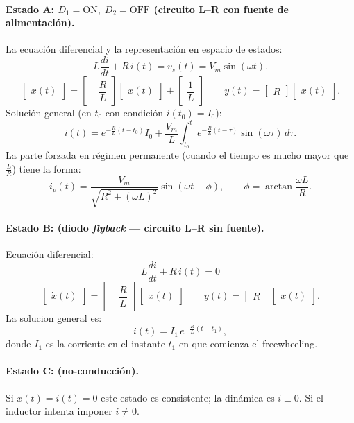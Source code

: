 \documentclass[conference]{IEEEtran}
\begin{document}
\paragraph{Estado A: \(D_1=\mathrm{ON},\;D_2=\mathrm{OFF}\) (circuito L–R  con fuente de alimentación).}
La ecuación diferencial y la representación en espacio de estados:
\[
L\frac{di}{dt} + R\,i(t) = v_s(t) = V_m\sin(\omega t).
\]
\[
\begin{bmatrix}\dot{x}(t)\end{bmatrix}
=
\begin{bmatrix}-\dfrac{R}{L}\end{bmatrix}
\begin{bmatrix}x(t)\end{bmatrix}
+
\begin{bmatrix}\dfrac{1}{L}\end{bmatrix}
\qquad
y(t)=\begin{bmatrix}R\end{bmatrix}\begin{bmatrix}x(t)\end{bmatrix}.
\]
Solución general (en \(t_0\) con condición \(i(t_0)=I_0\)):
\[
i(t)=e^{-\frac{R}{L}(t-t_0)}I_0 + \frac{V_m}{L}\int_{t_0}^{t} e^{-\frac{R}{L}(t-\tau)}\sin(\omega \tau)\,d\tau.
\]
La parte forzada en régimen permanente (cuando el tiempo es mucho mayor que \(\tfrac{L}{R}\)) tiene la forma:
\[
i_p(t)=\frac{V_m}{\sqrt{R^2+(\omega L)^2}}\sin(\omega t - \phi),\qquad \phi=\arctan\!\frac{\omega L}{R}.
\]

\paragraph{Estado B: (diodo \emph{flyback } — circuito L–R  sin fuente).}
Ecuación diferencial:
\[
L\frac{di}{dt} + R\,i(t) = 0
\]
\[
\begin{bmatrix}\dot{x}(t)\end{bmatrix}
=
\begin{bmatrix}-\dfrac{R}{L}\end{bmatrix}
\begin{bmatrix}x(t)\end{bmatrix}
\qquad
y(t)=\begin{bmatrix}R\end{bmatrix}\begin{bmatrix}x(t)\end{bmatrix}.
\]
La solucion general es:
\[
i(t)=I_1\,e^{-\frac{R}{L}(t-t_1)},
\]
donde \(I_1\) es la corriente en el instante \(t_1\) en que comienza el freewheeling.
\paragraph{Estado C: (no-conducción).}
Si \(x(t)=i(t)=0\) este estado es consistente; la dinámica es \(i\equiv 0\). Si el inductor intenta imponer \(i\neq0\). 
\end{document}
